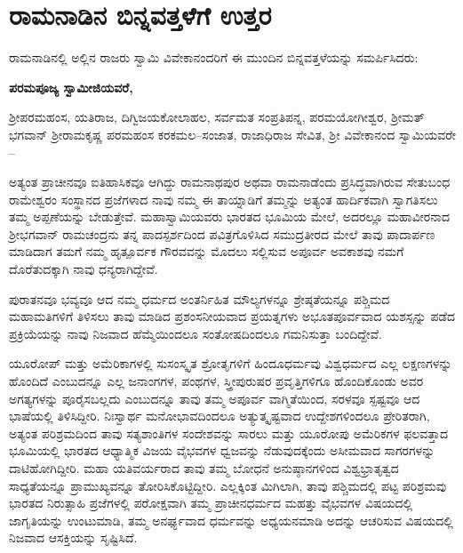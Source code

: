 
\chapter{ರಾಮನಾಡಿನ ಬಿನ್ನವತ್ತಳೆಗೆ ಉತ್ತರ}

ರಾಮನಾಡಿನಲ್ಲಿ ಅಲ್ಲಿನ ರಾಜರು ಸ್ವಾಮಿ ವಿವೇಕಾನಂದರಿಗೆ ಈ ಮುಂದಿನ ಬಿನ್ನವತ್ತಳೆ\break ಯನ್ನು ಸಮರ್ಪಿಸಿದರು:

\vskip 2pt

\textbf{ಪರಮಪೂಜ್ಯ ಸ್ವಾಮೀಜಿಯವರೆ,}

ಶ‍್ರೀಪರಮಹಂಸ, ಯತಿರಾಜ, ದಿಗ್ವಿಜಯಕೋಲಾಹಲ, ಸರ್ವಮತ ಸಂಪ್ರತಿಪನ್ನ, ಪರಮಯೋಗೀಶ್ವರ, ಶ‍್ರೀಮತ್​ ಭಗವಾನ್​ ಶ‍್ರೀರಾಮಕೃಷ್ಣ ಪರಮಹಂಸ ಕರಕಮಲ–ಸಂಜಾತ, ರಾಜಾಧಿರಾಜ ಸೇವಿತ, ಶ‍್ರೀ ವಿವೇಕಾನಂದ ಸ್ವಾಮಿಯವರೇ –

\vskip 2pt

ಅತ್ಯಂತ ಪ್ರಾಚೀನವೂ ಐತಿಹಾಸಿಕವೂ ಆಗಿದ್ದು ರಾಮನಾಥಪುರ ಅಥವಾ ರಾಮನಾಡೆಂದು ಪ್ರಸಿದ್ಧವಾಗಿರುವ ಸೇತುಬಂಧ ರಾಮೇಶ್ವರಂ ಸಂಸ್ಥಾನದ ಪ್ರಜೆಗಳಾದ ನಾವು ನಮ್ಮ ಈ ತಾಯ್ನಾಡಿಗೆ ತಮ್ಮನ್ನು ಅತ್ಯಂತ ಹಾರ್ದಿಕವಾಗಿ ಸ್ವಾಗತಿಸಲು ತಮ್ಮ ಅಪ್ಪಣೆಯನ್ನು ಬೇಡುತ್ತೇವೆ. ಮಹಾಸ್ವಾಮಿಯವರು ಭಾರತದ ಭೂಮಿಯ ಮೇಲೆ, ಅದರಲ್ಲೂ ಮಹಾವೀರನಾದ ಶ‍್ರೀಭಗವಾನ್​ ರಾಮಚಂದ್ರನು ತನ್ನ ಪಾದಸ್ಪರ್ಶದಿಂದ ಪವಿತ್ರಗೊಳಿಸಿದ ಸಮುದ್ರತೀರದ ಮೇಲೆ ತಾವು ಪಾದಾರ್ಪಣ ಮಾಡಿದಾಗ ತಮಗೆ ನಮ್ಮ ಹೃತ್ಪೂರ್ವಕ ಗೌರವವನ್ನು ಮೊದಲು ಸಲ್ಲಿಸುವ ಅಪೂರ್ವ ಅವಕಾಶವು ನಮಗೆ ದೊರೆತುದಕ್ಕಾಗಿ ನಾವು ಧನ್ಯರಾಗಿದ್ದೇವೆ.

\vskip 2pt

ಪುರಾತನವೂ ಭವ್ಯವೂ ಆದ ನಮ್ಮ ಧರ್ಮದ ಅಂತರ್ನಿಹಿತ ಮೌಲ್ಯಗಳನ್ನೂ ಶ್ರೇಷ್ಠತೆಯನ್ನೂ ಪಶ್ಚಿಮದ ಮಹಾಮತಿಗಳಿಗೆ ತಿಳಿಸಲು ತಾವು ಮಾಡಿದ ಪ್ರಶಂಸನೀಯವಾದ ಪ್ರಯತ್ನಗಳು ಅಭೂತಪೂರ್ವವಾದ ಯಶಸ್ಸನ್ನು ಪಡೆದ ಪ್ರಕ್ರಿಯೆಯನ್ನು ನಾವು ನಿಜವಾದ ಹೆಮ್ಮೆಯಿಂದಲೂ ಸಂತೋಷದಿಂದಲೂ ಗಮನಿಸುತ್ತಾ ಬಂದಿದ್ದೇವೆ.

\vskip 2pt


ಯೂರೋಪ್​ ಮತ್ತು ಅಮೆರಿಕಾಗಳಲ್ಲಿ ಸುಸಂಸ್ಕೃತ ಶ್ರೋತೃಗಳಿಗೆ ಹಿಂದೂಧರ್ಮವು ವಿಶ್ವಧರ್ಮದ ಎಲ್ಲ ಲಕ್ಷಣಗಳನ್ನು ಹೊಂದಿದೆ ಎಂಬುದನ್ನೂ ಎಲ್ಲ ಜನಾಂಗಗಳ, ಪಂಥಗಳ, ಸ್ತ್ರೀಪುರುಷರ ಪ್ರವೃತ್ತಿಗಳಿಗೂ ಹೊಂದಿಕೊಂಡು ಅವರ ಅಗತ್ಯಗಳನ್ನು ಪೂರೈಸಬಲ್ಲದು ಎಂಬುದನ್ನೂ ತಾವು ತಮ್ಮ ಅಪೂರ್ವ ವಾಗ್ಮಿತೆಯಿಂದ, ಸರಳವೂ ಸ್ಪಷ್ಟವೂ ಆದ ಭಾಷೆಯಲ್ಲಿ ತಿಳಿಸಿದ್ದೀರಿ. ನಿಃಸ್ವಾರ್ಥ ಮನೋಭಾವದಿಂದಲೂ ಅತ್ಯುತ್ಕೃಷ್ಟವಾದ ಉದ್ದೇಶಗಳಿಂದಲೂ ಪ್ರೇರಿತರಾಗಿ, ಅತ್ಯಂತ ಪರಿಶ್ರಮದಿಂದ ತಾವು ಸತ್ಯಶಾಂತಿಗಳ ಸಂದೇಶವನ್ನು ಸಾರಲು ಮತ್ತು ಯೂರೋಪು ಅಮೆರಿಕಗಳ ಫಲವತ್ತಾದ ಭೂಮಿಯಲ್ಲಿ ಭಾರತದ ಆಧ್ಯಾತ್ಮಿಕ ವಿಜಯ ವೈಭವಗಳ ಧ್ವಜವನ್ನು ನೆಡುವುದಕ್ಕೆಂದು ಅಸೀಮವಾದ ಸಾಗರಗಳನ್ನು ದಾಟಿಹೋಗಿದ್ದೀರಿ. ಮಹಾ ಯತಿವರ್ಯರಾದ ತಾವು ತಮ್ಮ ಬೋಧನೆ ಅನುಷ್ಠಾನಗಳಿಂದ ವಿಶ್ವಭ್ರಾತೃತ್ವದ ಸಾಧ್ಯತೆಯನ್ನೂ ಪ್ರಾಮುಖ್ಯವನ್ನೂ ತೋರಿಸಿಕೊಟ್ಟಿದ್ದೀರಿ. ಎಲ್ಲಕ್ಕಿಂತ ಮಿಗಿಲಾಗಿ, ತಾವು ಪಶ್ಚಿಮದಲ್ಲಿ ಪಟ್ಟ ಪರಿಶ್ರಮವು ಭಾರತದ ನಿರುತ್ಸಾಹಿ ಪ್ರಜೆಗಳಲ್ಲಿ ಪರೋಕ್ಷವಾಗಿ ತಮ್ಮ ಪ್ರಾಚೀನಧರ್ಮದ ಮಹತ್ತು ವೈಭವಗಳ ವಿಷಯದಲ್ಲಿ ಜಾಗೃತಿಯನ್ನು ಉಂಟುಮಾಡಿ, ತಮ್ಮ ಅನರ್ಘ್ಯವಾದ ಧರ್ಮವನ್ನು ಅಧ್ಯಯನಮಾಡಿ ಅದನ್ನು ಆಚರಿಸುವ ವಿಷಯದಲ್ಲಿ ನಿಜವಾದ ಆಸಕ್ತಿಯನ್ನು ಸೃಷ್ಟಿಸಿದೆ.

\vskip 2pt

